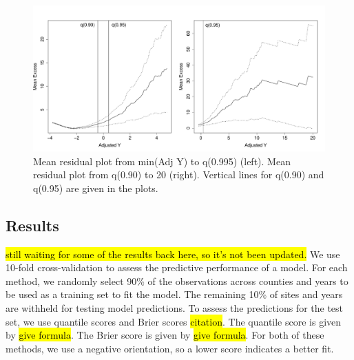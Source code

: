 \documentclass[11pt]{article}
\begin{document}
\begin{figure}[htbp]
  \centering
  \includegraphics[width = \linewidth]{plots/fire-mrl-plots.pdf}  %
  \caption{Mean residual plot from min(Adj Y) to q(0.995) (left). Mean residual plot from q(0.90) to 20 (right). Vertical lines for q(0.90) and q(0.95) are given in the plots.}
  \label{fig:mrlthresh}
\end{figure}


\subsection{Results}\label{s:results}
\hl{still waiting for some of the results back here, so it's not been updated.}
We use 10-fold cross-validation to assess the predictive performance of a model.
For each method, we randomly select 90\% of the observations across counties and years to be used as a training set to fit the model.
The remaining 10\% of sites and years are withheld for testing model predictions.
To assess the predictions for the test set, we use quantile scores and Brier scores \hl{citation}.
The quantile score is given by \hl{give formula}.
The Brier score is given by \hl{give formula}.
For both of these methods, we use a negative orientation, so a lower score indicates a better fit.
\end{document}
